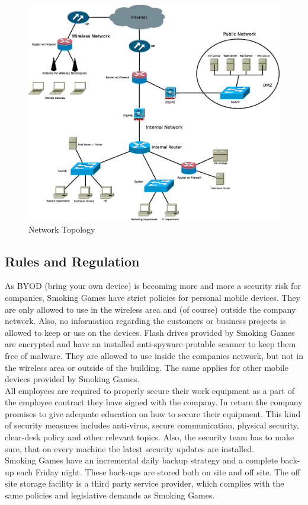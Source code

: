 \begin{figure}[h]\centering
	\includegraphics[scale=.3]{pictures/network_topology.eps}
	\caption{Network Topology}
	\label{fig:net_top}
\end{figure}
\subsection{Rules and Regulation}
As BYOD (bring your own device) is becoming more and more a security risk for companies, Smoking Games have strict policies for personal mobile devices. They are only allowed to use in the wireless area and (of course) outside the company network. Also, no information regarding the customers or business projects is allowed to keep or use on the devices. Flash drives provided by Smoking Games are encrypted and have an installed anti-spyware protable scanner to keep them free of malware. They are allowed to use inside the companies network, but not in the wireless area or outside of the building. The same applies for other mobile devices provided by Smoking Games.\\
All employees are required to properly secure their work equipment as a part of the employee contract they have signed with the company. In return the company promises to give adequate education on how to secure their equipment. This kind of security measures includes anti-virus,
secure communication, physical security, clear-desk policy and other relevant topics. Also, the security team has to make sure, that on every machine the latest security updates are installed.\\
Smoking Games have an incremental daily backup strategy and a complete back-up each Friday night. These back-ups are stored both on site and off site. The off site storage facility is a third party service provider, which complies with the same policies and legislative demands as Smoking Games.\\